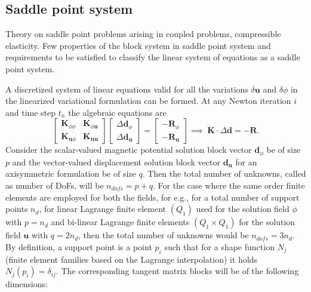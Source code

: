 \documentclass[11pt,a4paper,final]{article}
\begin{document}
\subsection{Saddle point system}
Theory on saddle point problems arising in coupled problems, compressible elasticity. Few properties of the block system in saddle point system and requirements to be satisfied to classify the linear system of equations as a saddle point system. \par 

A discretized system of linear equations valid for all the variations $\delta \mathbf{u}$ and $\delta \phi$ in the linearized variational formulation can be formed. At any Newton iteration $i$ and time step $t_n$ the algebraic equations are
\begin{equation}
\begin{bmatrix}
\mathbf{K}_{\phi \phi} & \mathbf{K}_{\phi \mathbf{u}} \\
\mathbf{K}_{\mathbf{u} \phi} & \mathbf{K}_{\mathbf{u} \mathbf{u}}
\end{bmatrix}
\begin{bmatrix}
\Delta \mathbf{d}_{\phi} \\
\Delta \mathbf{d}_{\mathbf{u}}
\end{bmatrix}
=
\begin{bmatrix}
-\mathbf{R}_{\phi} \\
-\mathbf{R}_{\mathbf{u}}
\end{bmatrix}
\implies \ \mathbf{K} \cdot \Delta \mathbf{d} = -\mathbf{R}.
\label{eq:3.10}
\end{equation}
Consider the scalar-valued magnetic potential solution block vector $\mathbf{d}_{\phi}$ be of size $p$ and the vector-valued displacement solution block vector $\mathbf{d}_{\mathbf{u}}$ for an axisymmetric formulation be of size $q$. Then the total number of unknowns, called as number of DoFs, will be $n_{dofs} = p + q$. For the case where the same order finite elements are employed for both the fields, for e.g., for a total number of support points $n_d$, for linear Lagrange finite element $(Q_1)$ used for the solution field $\phi$ with $p = n_d$ and bi-linear Lagrange finite elements $(Q_1 \times Q_1)$ for the solution field $\mathbf{u}$ with $q = 2 n_d$, then the total number of unknowns would be $n_{dofs} = 3 n_d$. By definition, a support point is a point $p_i$ such that for a shape function $N_j$ (finite element families based on the Lagrange interpolation) it holds $N_j (p_i) = \delta_{ij}$. The corresponding tangent matrix blocks will be of the following dimensions:
\end{document}
